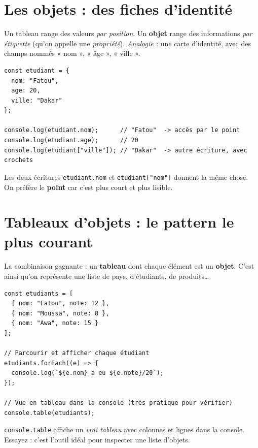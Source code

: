 \documentclass[11pt,a4paper]{article}
\newcommand{\code}[1]{\texttt{#1}}
\begin{document}
\section{Les objets : des fiches d'identité}

Un tableau range des valeurs \emph{par position}. Un \textbf{objet} range des informations \emph{par étiquette} (qu'on appelle une \emph{propriété}). \emph{Analogie :} une carte d'identité, avec des champs nommés « nom », « âge », « ville ».

\begin{lstlisting}[style=js]
const etudiant = {
  nom: "Fatou",
  age: 20,
  ville: "Dakar"
};

console.log(etudiant.nom);      // "Fatou"  -> accès par le point
console.log(etudiant.age);      // 20
console.log(etudiant["ville"]); // "Dakar"  -> autre écriture, avec crochets
\end{lstlisting}

Les deux écritures \code{etudiant.nom} et \code{etudiant["nom"]} donnent la même chose. On préfère le \textbf{point} car c'est plus court et plus lisible.

\section{Tableaux d'objets : le pattern le plus courant}

La combinaison gagnante : un \textbf{tableau} dont chaque élément est un \textbf{objet}. C'est ainsi qu'on représente une liste de pays, d'étudiants, de produits\ldots

\begin{lstlisting}[style=js]
const etudiants = [
  { nom: "Fatou", note: 12 },
  { nom: "Moussa", note: 8 },
  { nom: "Awa", note: 15 }
];

// Parcourir et afficher chaque étudiant
etudiants.forEach((e) => {
  console.log(`${e.nom} a eu ${e.note}/20`);
});

// Vue en tableau dans la console (très pratique pour vérifier)
console.table(etudiants);
\end{lstlisting}

\begin{infobox}[Vérification]
\code{console.table} affiche un \emph{vrai tableau} avec colonnes et lignes dans la console. Essayez : c'est l'outil idéal pour inspecter une liste d'objets.
\end{infobox}
\end{document}
